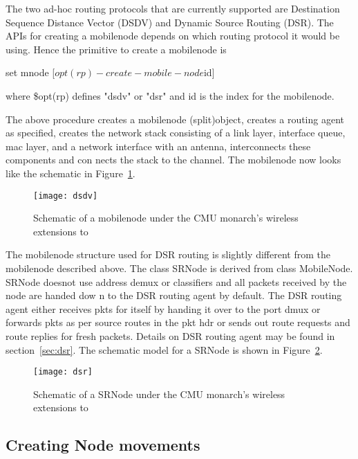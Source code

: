 
The two ad-hoc routing protocols that are currently supported are
Destination Sequence Distance Vector (DSDV) and Dynamic Source Routing
(DSR). The APIs for creating a mobilenode depends on which routing
protocol it would be using. Hence the primitive to    
create a mobilenode is

\begin{program}
	set mnode [$opt(rp)-create-mobile-node $id] 
\end{program}
where \$opt(rp) defines "dsdv" or "dsr" and id is the index for the mobilenode.

The above procedure creates a mobilenode (split)object, creates a routing
agent as specified, creates the network stack consisting of a link layer,
interface queue, mac layer, and a network interface with an antenna,
interconnects these components and con   
nects the stack to the channel. The mobilenode now looks like the
schematic in Figure~\ref{fig:mobilenode-dsdv}.  
\begin{figure}
    \centerline{\texttt{[image: dsdv]}}
    \caption{Schematic of a mobilenode under the CMU monarch's wireless
extensions to \ns} 
    \label{fig:mobilenode-dsdv}
\end{figure}

The mobilenode structure used for DSR routing is slightly different from
the mobilenode described above. The class SRNode is derived from class
MobileNode. SRNode doesnot use address demux or classifiers and all
packets received by the node are handed dow   
n to the DSR routing agent by default. The DSR routing agent either
receives pkts for itself by handing it over to the port dmux or forwards
pkts as per source routes in the pkt hdr or sends out route requests and
route replies for fresh packets. Details    
on DSR routing agent may be found in section~\ref{sec:dsr}. The schematic
model for a SRNode is shown in Figure~\ref{fig:mobilenode-dsr}. 
\begin{figure}[tb]
    \centerline{\texttt{[image: dsr]}}
    \caption{Schematic of a SRNode under the CMU monarch's wireless
extensions to \ns} 
    \label{fig:mobilenode-dsr}
\end{figure}

\subsection{Creating Node movements}
\label{sec:mobilenode-movements}

